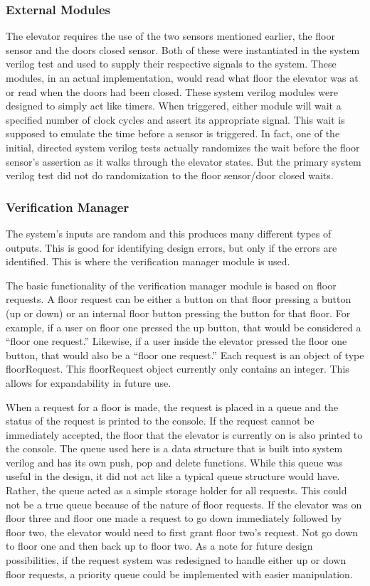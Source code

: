\documentclass[journal]{IEEEtran}
\begin{document}
\subsubsection{External Modules}
The elevator requires the use of the two sensors mentioned earlier, the floor sensor and the doors closed sensor. Both of these were instantiated in the system verilog test and used to supply their respective signals to the system. These modules, in an actual implementation, would read what floor the elevator was at or read when the doors had been closed. These system verilog modules were designed to simply act like timers. When triggered, either module will wait a specified number of clock cycles and assert its appropriate signal. This wait is supposed to emulate the time before a sensor is triggered. In fact, one of the initial, directed system verilog tests actually randomizes the wait before the floor sensor’s assertion as it walks through the elevator states. But the primary system verilog test did not do randomization to the floor sensor/door closed waits.

\subsubsection{Verification Manager}
The system’s inputs are random and this produces many different types of outputs. This is good for identifying design errors, but only if the errors are identified. This is where the verification manager module is used.

The basic functionality of the verification manager module is based on floor requests. A floor request can be either a button on that floor pressing a button (up or down) or an internal floor button pressing the button for that floor. For example, if a user on floor one pressed the up button, that would be considered a “floor one request.” Likewise, if a user inside the elevator pressed the floor one button, that would also be a “floor one request.” Each request is an object of type floorRequest. This floorRequest object currently only contains an integer. This allows for expandability in future use.

When a request for a floor is made, the request is placed in a queue and the status of the request is printed to the console. If the request cannot be immediately accepted, the floor that the elevator is currently on is also printed to the console. The queue used here is a data structure that is built into system verilog and has its own push, pop and delete functions. While this queue was useful in the design, it did not act like a typical queue structure would have. Rather, the queue acted as a simple storage holder for all requests. This could not be a true queue because of the nature of floor requests. If the elevator was on floor three and floor one made a request to go down immediately followed by floor two, the elevator would need to first grant floor two’s request. Not go down to floor one and then back up to floor two. As a note for future design possibilities, if the request system was redesigned to handle either up or down floor requests, a priority queue could be implemented with easier manipulation.
\end{document}
